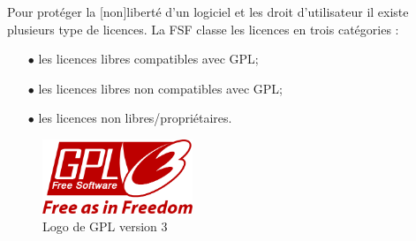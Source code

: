 Pour protéger la [non]liberté d'un logiciel et les droit d'utilisateur il existe plusieurs type de licences. La FSF classe les licences en trois catégories :

\begin{itemize}
	\item[$\bullet$] les licences libres compatibles avec GPL;
	\item[$\bullet$] les licences libres non compatibles avec GPL;
	\item[$\bullet$] les licences non libres/propriétaires.
\end{itemize}

\begin{figure}[!ht]
    \centerline{
    	\includegraphics[width=0.4\textwidth]{./images/GPLv3_Logo.png}
    	}
    \caption{Logo de GPL version 3}
    \label{logo-gpl}
\end{figure}
